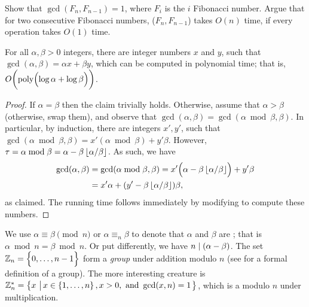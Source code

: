 \begin{exercise}
    Show that $\gcd(F_n, F_{n-1}) =1$, where $F_i$ is the $i$\th
    Fibonacci number. Argue that for two consecutive Fibonacci
    numbers, \allowbreak($F_n,F_{n-1}$) takes
    $O(n)$ time, if every operation takes $O(1)$ time.
\end{exercise}

\begin{lemma}
    For all $\alpha, \beta > 0$ integers, there are integer numbers
    $x$ and $y$, such that $\gcd(\alpha,\beta) = \alpha x + \beta y$,
    which can be computed in polynomial time; that is, $O\pth{
       \biggl. \poly \pth{ \Bigl. \log \alpha + \log \beta }}$.
\end{lemma}

\begin{proof}
    If $\alpha = \beta$ then the claim trivially holds. Otherwise,
    assume that $\alpha > \beta$ (otherwise, swap them), and observe
    that $\gcd(\alpha, \beta) = \gcd(\alpha \bmod \beta, \beta)$. In
    particular, by induction, there are integers $x', y'$, such that
    $\gcd(\alpha \bmod \beta, \beta) = x'(\alpha \bmod \beta) + y'
    \beta$. However, $\tau = \alpha \bmod \beta = \alpha - \beta
    \left\lfloor { \alpha / \beta} \right\rfloor$. As such, we have
    \begin{align*}
        \gcd(\alpha, \beta)%
        &=%
        \gcd(\alpha \bmod \beta, \beta)%
        =%
        x'\pth[]{ \Bigl. \alpha - \beta \floor{ \alpha / \beta} } +
        y'\beta\\
        &=%
        x'\alpha + \pth[]{y' - \beta \floor{ \alpha / \beta} } \beta,%
    \end{align*}
    as claimed. The running time follows immediately by modifying
    \algGCD to compute these numbers.
\end{proof}

We use $\alpha \equiv \beta \pmod{n}$ or $\alpha \equiv_n \beta$ to
denote that $\alpha$ and $\beta$ are ;
that is $\alpha \bmod n = \beta \bmod n$. Or put differently, we have
$n \divides \pth[]{\alpha - \beta}$. The set $\mathbb{Z}_n = \left\{ {0, \ldots,
   n-1 \Bigl. } \right\}$ form a \emph{group} under addition modulo $n$ (see
 for a formal definition of a group).  The more
interesting creature is $\mathbb{Z}_n^* = \left\{ {x \,\left|\, { x \in \left\{ {1,\ldots,
         n} \right\}, x > 0, \text{ and } \gcd(x, n) =1} \bigr.\right.} \right\}$, which is a
 modulo $n$ under multiplication.

